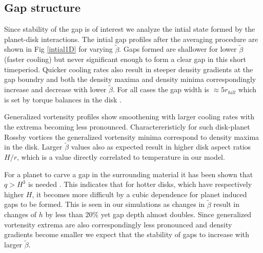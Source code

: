 \subsection{Gap structure}

Since stability of the gap is of interest we analyze the intial state formed by the planet-disk interactions. The intial gap profiles after the averaging procedure are shown in Fig \ref{intial1D} for varying $\tilde\beta$. Gaps formed are shallower for lower $\tilde\beta$ (faster cooling) but never significant enough to form a clear gap in this short timeperiod. Quicker cooling rates also result in steeper density gradients at the gap boundry and both the density maxima and density minima correspondingly increase and decrease with lower $\tilde\beta$. For all cases the gap width is $\approx 5r_{hill}$ which is set by torque balances in the disk \citep{crida06}.

 Generalized vortensity profiles show smoothening with larger cooling rates with the extrema becoming less pronounced. Charactereristicly for such disk-planet Rossby vortices the generalized vortensity minima correspond to density maxima in the disk. Larger $\tilde\beta$ values also as expected result in higher disk aspect ratios $H/r$, which is a value directly correlated to temperature in our model.

 For a planet to carve a gap in the surrounding material it has been shown that $q>H^3$ is needed \citep{crida06}. This indicates that for hotter disks, which have respectively higher $H$, it becomes more difficult by a cubic dependence for planet induced gaps to be formed. This is seen in our simulations as changes in $\tilde{\beta}$ result in changes of $h$ by less than $20\%$ yet gap depth almost doubles. Since generalized vortensity extrema are also correspondingly less pronounced and density gradients become smaller we expect that the stability of gaps to increase with larger $\tilde{\beta}$.

